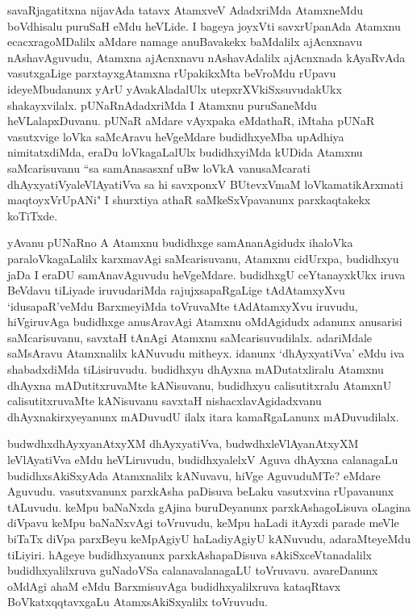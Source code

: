 
\begin{artha}
savaRjagatitxna nijavAda tatavx AtamxveV AdadxriMda AtamxneMdu boVdhisalu puruSaH eMdu heVLide. I bageya joyxVti savxrUpanAda Atamxnu ecacxragoMDalilx aMdare namage anuBavakekx baMdalilx ajAcnxnavu nAshavAguvudu, Atamxna ajAcnxnavu nAshavAdalilx ajAcnxnada kAyaRvAda vasutxgaLige parxtayxgAtamxna rUpakikxMta beVroMdu rUpavu ideyeMbudanunx yArU yAvakAladalUlx utepxrXVkiSxsuvudakUkx shakayxvilalx. pUNaRnAdadxriMda I Atamxnu puruSaneMdu heVLalapxDuvanu. pUNaR aMdare vAyxpaka eMdathaR, iMtaha pUNaR vasutxvige loVka saMcAravu heVgeMdare budidhxyeMba upAdhiya nimitatxdiMda, eraDu loVkagaLalUlx budidhxyiMda kUDida Atamxnu saMcarisuvanu ``sa samAnasasxnf uBw loVkA vanusaMcarati dhAyxyatiVyaleVlAyatiVva sa hi savxponxV BUtevxVmaM loVkamatikArxmati maqtoyxVrUpANi" I shurxtiya athaR saMkeSxVpavanunx parxkaqtakekx koTiTxde.
\end{artha}%



\begin{artha}
yAvanu pUNaRno A Atamxnu budidhxge samAnanAgidudx ihaloVka paraloVkagaLalilx karxmavAgi saMcarisuvanu, Atamxnu cidUrxpa, budidhxyu jaDa I eraDU samAnavAguvudu heVgeMdare. budidhxgU ceYtanayxkUkx iruva BeVdavu tiLiyade iruvudariMda rajujxsapaRgaLige tAdAtamxyXvu `idusapaR'veMdu BarxmeyiMda toVruvaMte tAdAtamxyXvu iruvudu, hiVgiruvAga budidhxge anusAravAgi Atamxnu oMdAgidudx adanunx anusarisi saMcarisuvanu, savxtaH tAnAgi Atamxnu saMcarisuvudilalx. adariMdale saMsAravu Atamxnalilx kANuvudu mitheyx. idanunx `dhAyxyatiVva' eMdu iva shabadxdiMda tiLisiruvudu. budidhxyu dhAyxna mADutatxliralu Atamxnu dhAyxna mADutitxruvaMte kANisuvanu, budidhxyu calisutitxralu AtamxnU calisutitxruvaMte kANisuvanu savxtaH nishacxlavAgidadxvanu dhAyxnakirxyeyanunx mADuvudU ilalx itara kamaRgaLanunx mADuvudilalx. 
\end{artha}

\begin{artha}%
budwdhxdhAyxyanAtxyXM dhAyxyatiVva, budwdhxleVlAyanAtxyXM leVlAyatiVva eMdu heVLiruvudu, budidhxyalelxV Aguva dhAyxna calanagaLu budidhxsAkiSxyAda Atamxnalilx kANuvavu, hiVge AguvuduMTe? eMdare Aguvudu. vasutxvanunx parxkAsha paDisuva beLaku vasutxvina rUpavanunx tALuvudu. keMpu baNaNxda gAjina buruDeyanunx parxkAshagoLisuva oLagina diVpavu keMpu baNaNxvAgi toVruvudu, keMpu haLadi itAyxdi parade meVle biTaTx diVpa parxBeyu keMpAgiyU haLadiyAgiyU kANuvudu, adaraMteyeMdu tiLiyiri. hAgeye budidhxyanunx parxkAshapaDisuva sAkiSxceVtanadalilx budidhxyalilxruva guNadoVSa calanavalanagaLU toVruvavu. avareDanunx oMdAgi ahaM eMdu BarxmisuvAga budidhxyalilxruva kataqRtavx BoVkatxqqtavxgaLu AtamxsAkiSxyalilx toVruvudu. 
\end{artha}

